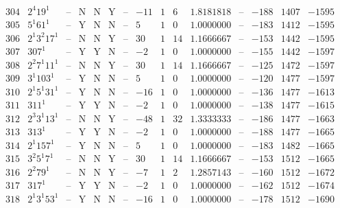\documentclass[11pt,reqno,a4letter]{article}
\numberwithin{figure}{section}
\numberwithin{table}{section}
\theoremstyle{plain}
\numberwithin{theorem}{section}
\theoremstyle{definition}
\begin{document}
\begin{table}[h!]
\begin{equation*}
{\begin{array}{|cc|c|ccc|c|c|ccc|c|ccc}
 304 & 2^4 19^1 & \text{--} & \text{N} & \text{N} & \text{Y} & \text{--} & -11 & 1 & 6 & 1.8181818 & \text{--} & -188 & 1407 & -1595 \\
 305 & 5^1 61^1 & \text{--} & \text{Y} & \text{N} & \text{N} & \text{--} & 5 & 1 & 0 & 1.0000000 & \text{--} & -183 & 1412 & -1595 \\
 306 & 2^1 3^2 17^1 & \text{--} & \text{N} & \text{N} & \text{Y} & \text{--} & 30 & 1 & 14 & 1.1666667 & \text{--} & -153 & 1442 & -1595 \\
 307 & 307^1 & \text{--} & \text{Y} & \text{Y} & \text{N} & \text{--} & -2 & 1 & 0 & 1.0000000 & \text{--} & -155 & 1442 & -1597 \\
 308 & 2^2 7^1 11^1 & \text{--} & \text{N} & \text{N} & \text{Y} & \text{--} & 30 & 1 & 14 & 1.1666667 & \text{--} & -125 & 1472 & -1597 \\
 309 & 3^1 103^1 & \text{--} & \text{Y} & \text{N} & \text{N} & \text{--} & 5 & 1 & 0 & 1.0000000 & \text{--} & -120 & 1477 & -1597 \\
 310 & 2^1 5^1 31^1 & \text{--} & \text{Y} & \text{N} & \text{N} & \text{--} & -16 & 1 & 0 & 1.0000000 & \text{--} & -136 & 1477 & -1613 \\
 311 & 311^1 & \text{--} & \text{Y} & \text{Y} & \text{N} & \text{--} & -2 & 1 & 0 & 1.0000000 & \text{--} & -138 & 1477 & -1615 \\
 312 & 2^3 3^1 13^1 & \text{--} & \text{N} & \text{N} & \text{Y} & \text{--} & -48 & 1 & 32 & 1.3333333 & \text{--} & -186 & 1477 & -1663 \\
 313 & 313^1 & \text{--} & \text{Y} & \text{Y} & \text{N} & \text{--} & -2 & 1 & 0 & 1.0000000 & \text{--} & -188 & 1477 & -1665 \\
 314 & 2^1 157^1 & \text{--} & \text{Y} & \text{N} & \text{N} & \text{--} & 5 & 1 & 0 & 1.0000000 & \text{--} & -183 & 1482 & -1665 \\
 315 & 3^2 5^1 7^1 & \text{--} & \text{N} & \text{N} & \text{Y} & \text{--} & 30 & 1 & 14 & 1.1666667 & \text{--} & -153 & 1512 & -1665 \\
 316 & 2^2 79^1 & \text{--} & \text{N} & \text{N} & \text{Y} & \text{--} & -7 & 1 & 2 & 1.2857143 & \text{--} & -160 & 1512 & -1672 \\
 317 & 317^1 & \text{--} & \text{Y} & \text{Y} & \text{N} & \text{--} & -2 & 1 & 0 & 1.0000000 & \text{--} & -162 & 1512 & -1674 \\
 318 & 2^1 3^1 53^1 & \text{--} & \text{Y} & \text{N} & \text{N} & \text{--} & -16 & 1 & 0 & 1.0000000 & \text{--} & -178 & 1512 & -1690 \\

\end{array}}
\end{equation*}
\end{table}
\end{document}
